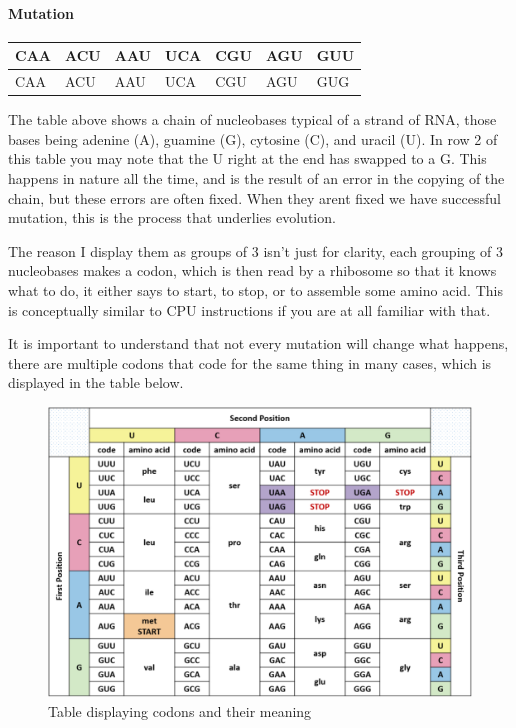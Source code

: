 \documentclass[11pt]{article}
\begin{document}
\paragraph{Mutation}
\label{sec:org652649d}
\begin{center}
\begin{tabular}{lllllll}
CAA & ACU & AAU & UCA & CGU & AGU & GUU\\
\hline
CAA & ACU & AAU & UCA & CGU & AGU & GUG\\
\end{tabular}
\end{center}
The table above shows a chain of nucleobases typical of a strand of RNA, those bases being adenine (A), guamine (G), cytosine (C), and uracil (U). In row 2 of this table  you may note that the U right at the end has swapped to a G. This happens in nature all the time, and is the result of an error in the copying of the chain, but these errors are often fixed. When they arent fixed we have successful mutation, this is the process that underlies evolution.

The reason I display them as groups of 3 isn't just for clarity, each grouping of 3 nucleobases makes a codon, which is then read by a rhibosome so that it knows what to do, it either says to start, to stop, or to assemble some amino acid. This is conceptually similar to CPU instructions if you are at all familiar with that.

It is important to understand that not every mutation will change what happens, there are multiple codons that code for the same thing in many cases, which is displayed in the table below.

\begin{figure}[htbp]
\centering
\includegraphics[width=.9\linewidth]{./images/codon-table.png}
\caption{Table displaying codons and their meaning}
\end{figure}
\end{document}
